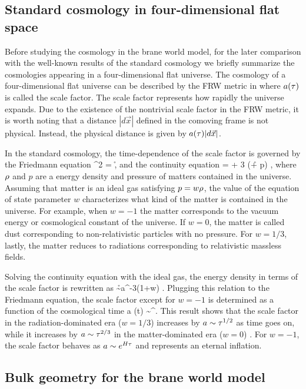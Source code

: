 \documentclass[12pt]{article}
\begin{document}
\subsection{Standard cosmology in four-dimensional flat space}

Before studying the cosmology in the brane world model, for the later comparison with the well-known results of the standard cosmology we briefly summarize the cosmologies appearing in a four-dimensional flat universe. The cosmology of a four-dimensional flat universe can be described by the FRW metric in  where $a(\tau)$ is called the scale factor. The scale factor represents how rapidly the universe expands. Due to the existence of the nontrivial scale factor in the FRW metric, it is worth noting that a distance $|d\vec{x}|$ defined in the comoving frame is not physical. Instead, the physical distance is given by  $a(\tau)  | d\vec{x}|$.

In the standard cosmology, the time-dependence of the scale factor is governed by the Friedmann equation
\be
\ls {} \rs^2 =  \r   ,
\ee
and the continuity equation
=\dot{\r} + 3 \ls {} \rs (\r + p) ,
\ee
where $\rho$ and $p$ are a energy density and pressure of matters contained in the universe. Assuming that matter is an ideal gas satisfying $ p = w \rho$, the value of the equation of state parameter $w$ characterizes what kind of the matter is contained in the universe. For example, when $w=-1$ the matter corresponds to the vacuum energy or cosmological constant of the universe. If $w=0$, the matter is called dust corresponding to non-relativistic particles with no pressure. For $w=1/3$, lastly, the matter reduces to radiations corresponding to relativistic massless fields. 

Solving the continuity equation with the ideal gas, the energy density in terms of the scale factor is rewritten as
\be
\r \sim a^{-3(1+w)} .
\ee
Plugging this relation to the Friedmann equation, the scale factor except for $w = -1$ is determined as a function of the cosmological time
\be
a (t) \sim \ta^{}. 
\ee
This result shows that the scale factor in the radiation-dominated era ($w=1/3$) increases by $a \sim \tau^{1/2}$ as time goes on, while it increases by $a\sim \tau^{2/3}$ in the matter-dominated era ($w=0$) . For $w=-1$, the scale factor behaves as $a \sim e^{H \tau}$ and represents an eternal inflation.



\subsection{Bulk geometry for the brane world model}
\end{document}

